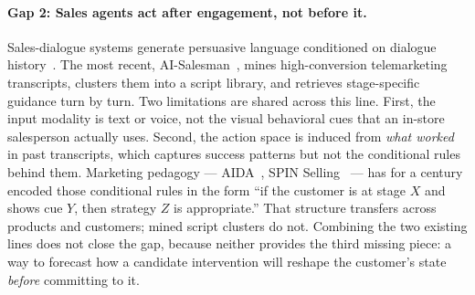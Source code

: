 \documentclass{article}
\begin{document}
\paragraph{Gap 2: Sales agents act after engagement, not before it.}
Sales-dialogue systems generate persuasive language conditioned on dialogue history~\cite{PersuasionForGood,Hiraoka2016,SalesBot,SalesBot2,SalesAgent,CSales,AffectMind,SalesRLAgent,AISalesman}. The most recent, AI-Salesman~\cite{AISalesman}, mines high-conversion telemarketing transcripts, clusters them into a script library, and retrieves stage-specific guidance turn by turn. Two limitations are shared across this line. First, the input modality is text or voice, not the visual behavioral cues that an in-store salesperson actually uses. Second, the action space is induced from \emph{what worked} in past transcripts, which captures success patterns but not the conditional rules behind them. Marketing pedagogy --- AIDA~\cite{Lewis1898,StrongHughes}, SPIN Selling~\cite{Rackham} --- has for a century encoded those conditional rules in the form ``if the customer is at stage $X$ and shows cue $Y$, then strategy $Z$ is appropriate.'' That structure transfers across products and customers; mined script clusters do not. Combining the two existing lines does not close the gap, because neither provides the third missing piece: a way to forecast how a candidate intervention will reshape the customer's state \emph{before} committing to it.
\end{document}
